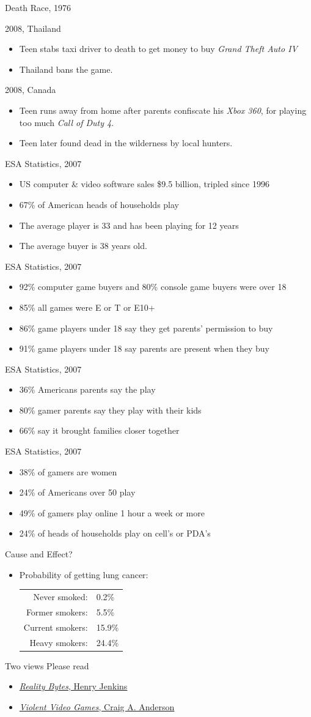 \documentclass[troispoints,colorBG,slideColor]{prosper}
\newcommand{\ns}[1]{\vfill \end{slide}\begin{slide}{#1}}
\newcommand{\bi}{\begin{itemize}}
\newcommand{\ei}{\end{itemize}}
\begin{document}
\begin{slide}{Death Race, 1976}
\ns{2008, Thailand}
\bi
\item Teen stabs taxi driver to death to get money to buy {\em Grand
  Theft Auto IV}
\item Thailand bans the game.
\ei

\ns{2008, Canada}
\bi
\item Teen runs away from home after parents confiscate his {\em Xbox
  360}, for playing too much {\em Call of Duty 4}.
\item Teen later found dead in the wilderness by local hunters.
\ei

\ns{ESA Statistics, 2007}
\bi
\item US computer \& video software sales \$9.5 billion,
tripled since 1996
\item 67\% of American heads of households play
\item The average player is 33 and has been playing for 12 years
\item The average buyer is 38 years old.
\ei
\ns{ESA Statistics, 2007}
\bi
\item 92\% computer game buyers and 80\% console game buyers were over 18
\item 85\% all games were E or T or E10+
\item 86\% game players under 18 say they get parents' permission to buy
\item 91\% game players under 18 say parents are present when they buy
\ei
\ns{ESA Statistics, 2007}
\bi
\item 36\% Americans parents say the play
\item 80\% gamer parents say they play with their kids
\item 66\% say it brought families closer together
\ei

\ns{ESA Statistics, 2007}
\bi
\item 38\% of gamers are women
\item 24\% of Americans over 50 play
\item 49\% of gamers play online 1 hour a week or more
\item 24\% of heads of households play on cell's or PDA's
\ei

\ns{Cause and Effect?}
\bi
\item Probability of getting lung cancer:
\begin{tabular}{|rl|}\hline
Never smoked: &  0.2\%\\
Former smokers: & 5.5\% \\
Current smokers: & 15.9\%\\
Heavy smokers: & 24.4\%\\
\hline
\end{tabular}
\ei

\ns{Two views}
Please read
\bi
\item \href{http://www.pbs.org/kcts/videogamerevolution/impact/myths.html}
{{\em Reality Bytes}, Henry Jenkins}
\item \href{http://www.apa.org/science/psa/sb-anderson.html}
{{\em Violent Video Games},
Craig A. Anderson}
\ei

\end{slide}
\end{document}
